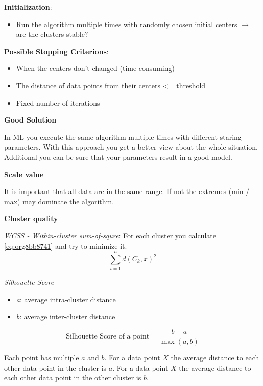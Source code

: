 \documentclass[11pt,twoside,landscape]{article}
\begin{document}
\begin{multicols}{3}
\textbf{Initialization}:

\begin{itemize}
\item Run the algorithm multiple times with randomly chosen initial centers \(\rightarrow\) are the clusters stable?
\end{itemize}


\textbf{Possible Stopping Criterions}:

\begin{itemize}
\item When the centers don't changed (time-consuming)
\item The distance of data points from their centers <= threshold
\item Fixed number of iterations
\end{itemize}


\textbf{Good Solution}

In ML you execute the same algorithm multiple times with different staring parameters.
With this approach you get a better view about the whole situation.
Additional you can be sure that your parameters result in a good model.


\textbf{Scale value}

It is important that all data are in the same range.
If not the extremes (min / max) may dominate the algorithm.


\textbf{Cluster quality}

\emph{WCSS - Within-cluster sum-of-squre}: For each cluster you calculate \ref{eq:org8bb8741} and try to minimize it.
\begin{equation}
\label{eq:org8bb8741}
\sum_{i=1}^n d(C_k, x)^2
\end{equation}

\emph{Silhouette Score}
\begin{itemize}
\item \emph{a}: average intra-cluster distance
\item \emph{b}: average inter-cluster distance
\end{itemize}
\begin{equation}
  \text{Silhouette Score of a point} = \frac{b-a}{\max(a,b)}
\end{equation}

Each point has multiple \(a\) and \(b\).
For a data point \(X\) the average distance to each other data point in the cluster is \(a\).
For a data point \(X\) the average distance to each other data point in the other cluster is \(b\).



\end{multicols}
\end{document}
